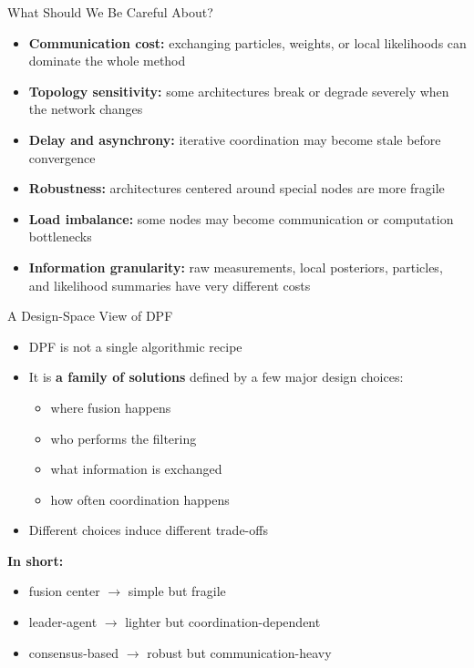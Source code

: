 \documentclass[aspectratio=169]{beamer}
\begin{document}
\begin{frame}{What Should We Be Careful About?}

\begin{itemize}
    \item \textbf{Communication cost:} exchanging particles, weights, or local likelihoods can dominate the whole method
    \item \textbf{Topology sensitivity:} some architectures break or degrade severely when the network changes
    \item \textbf{Delay and asynchrony:} iterative coordination may become stale before convergence
    \item \textbf{Robustness:} architectures centered around special nodes are more fragile
    \item \textbf{Load imbalance:} some nodes may become communication or computation bottlenecks
    \item \textbf{Information granularity:} raw measurements, local posteriors, particles, and likelihood summaries have very different costs
\end{itemize}

\end{frame}


\begin{frame}{A Design-Space View of DPF}

\begin{itemize}
    \item DPF is not a single algorithmic recipe
    \item It is \textbf{a family of solutions} defined by a few major design choices:
    \begin{itemize}
        \item where fusion happens
        \item who performs the filtering
        \item what information is exchanged
        \item how often coordination happens
    \end{itemize}
    \item Different choices induce different trade-offs
\end{itemize}

\vspace{0.3cm}

\textbf{In short:}
\begin{itemize}
    \item fusion center $\rightarrow$ simple but fragile
    \item leader-agent $\rightarrow$ lighter but coordination-dependent
    \item consensus-based $\rightarrow$ robust but communication-heavy
\end{itemize}

\end{frame}
\end{document}
